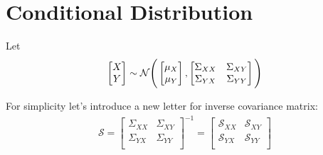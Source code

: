 \section{Conditional Distribution}
Let 
\begin{align}
\begin{bmatrix}
	X \\ Y
\end{bmatrix}
\sim \mathcal{N} \Bigg(
\begin{bmatrix}
	\mu_X \\ \mu_Y
\end{bmatrix},
\begin{bmatrix}
	\Sigma_{XX} & 	\Sigma_{XY} \\
	\Sigma_{YX} & 	\Sigma_{YY} \\
\end{bmatrix}
\Bigg)
\end{align}

For simplicity let's introduce a new letter for inverse covariance matrix:
\begin{align}
	\mathcal{S} = \begin{bmatrix}
		\Sigma_{XX} & 	\Sigma_{XY} \\
		\Sigma_{YX} & 	\Sigma_{YY} \\
	\end{bmatrix} ^ {-1} 
= \begin{bmatrix}
	\mathcal{S}_{XX} & 	\mathcal{S}_{XY} \\
	\mathcal{S}_{YX} & 	\mathcal{S}_{YY} \\
\end{bmatrix}
\end{align}